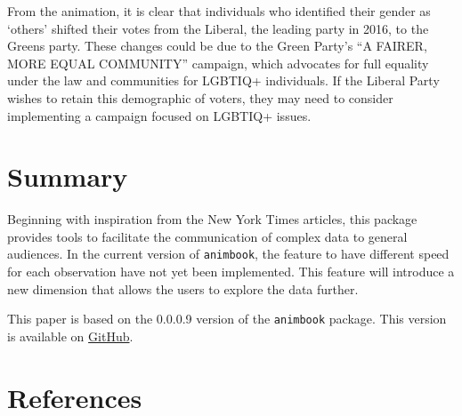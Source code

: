 From the animation, it is clear that individuals who identified their gender as `others' shifted their votes from the Liberal, the leading party in 2016, to the Greens party. These changes could be due to the Green Party's ``A FAIRER, MORE EQUAL COMMUNITY'' campaign, which advocates for full equality under the law and communities for LGBTIQ+ individuals. If the Liberal Party wishes to retain this demographic of voters, they may need to consider implementing a campaign focused on LGBTIQ+ issues.

\hypertarget{summary}{%
\section{Summary}\label{summary}}

Beginning with inspiration from the New York Times articles, this package provides tools to facilitate the communication of complex data to general audiences. In the current version of \texttt{animbook}, the feature to have different speed for each observation have not yet been implemented. This feature will introduce a new dimension that allows the users to explore the data further.

This paper is based on the 0.0.0.9 version of the \texttt{animbook} package. This version is available on \href{https://github.com/KrisanatA/animbook}{GitHub}.

\hypertarget{references}{%
\section*{References}\label{references}}

